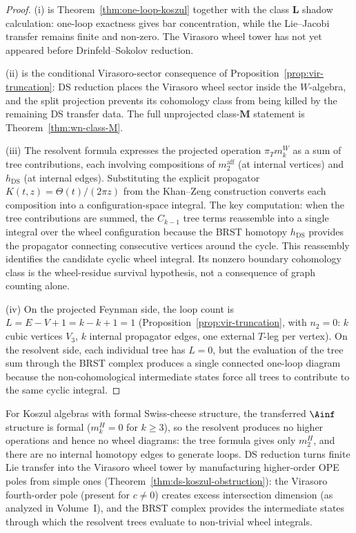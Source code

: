 \begin{proof}
(i) is Theorem~\ref{thm:one-loop-koszul} together with the class
$\mathbf{L}$ shadow calculation: one-loop exactness gives bar
concentration, while the Lie--Jacobi transfer remains finite and
non-zero. The Virasoro wheel tower has not yet appeared before
Drinfeld--Sokolov reduction.

(ii) is the conditional Virasoro-sector consequence of
Proposition~\ref{prop:vir-truncation}: DS reduction places the
Virasoro wheel sector inside the $W$-algebra, and the split projection
prevents its cohomology class from being killed by the remaining
DS transfer data. The full unprojected class-$\mathbf M$ statement is
Theorem~\ref{thm:wn-class-M}.

(iii) The resolvent formula expresses the projected operation
$\pi_T m_k^W$ as a sum of tree
contributions, each involving compositions of
$m_2^{\mathrm{aff}}$ (at internal vertices) and
$h_{\mathrm{DS}}$ (at internal edges). Substituting the
explicit propagator $K(t,z) = \Theta(t)/(2\pi z)$ from the
Khan--Zeng construction converts each composition into a
configuration-space integral. The key computation: when the
tree contributions are summed, the $C_{k-1}$ tree terms
reassemble into a single integral over the wheel configuration
because the BRST homotopy $h_{\mathrm{DS}}$ provides the
propagator connecting consecutive vertices around the cycle.
This reassembly identifies the candidate cyclic wheel integral. Its
nonzero boundary cohomology class is the wheel-residue survival
hypothesis, not a consequence of graph counting alone.

(iv) On the projected Feynman side, the loop count is
$L = E - V + 1 = k - k + 1 = 1$
(Proposition~\ref{prop:vir-truncation}, with $n_2 = 0$:
$k$ cubic vertices $V_3$, $k$ internal propagator edges,
one external $T$-leg per vertex). On the resolvent side,
each individual tree has $L = 0$, but the evaluation
of the tree sum through the BRST complex produces a single
connected one-loop diagram because the non-cohomological
intermediate states force all trees to contribute to the same
cyclic integral.
\end{proof}

\begin{remark}
\label{rem:koszul-no-folding}
For Koszul algebras with formal Swiss-cheese structure, the
transferred $\Ainf$ structure is formal
($m_k^H = 0$ for $k \geq 3$), so the resolvent produces no
higher operations and hence no wheel diagrams: the tree formula
gives only $m_2^H$, and there are no internal homotopy edges
to generate loops. DS reduction turns finite Lie transfer into the
Virasoro wheel tower by manufacturing higher-order OPE poles from simple ones
(Theorem~\ref{thm:ds-koszul-obstruction}): the Virasoro
fourth-order pole (present for $c \neq 0$) creates excess intersection dimension
\textup{(}as analyzed in Volume~I\textup{)}, and the BRST
complex provides the intermediate states through which the
resolvent trees evaluate to non-trivial wheel integrals.
\end{remark}

